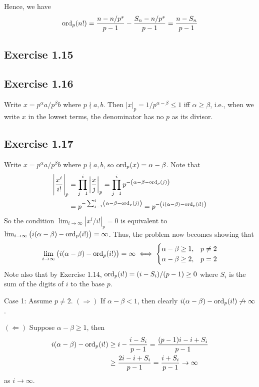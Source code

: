 \documentclass[../Koblitz.tex]{subfiles}
\begin{document}
Hence, we have
\begin{align*}
    \operatorname{ord}_p(n!) = \frac{n-n/p^s}{p-1} - \frac{S_n - n/p^s}{p-1} = \frac{n-S_n}{p-1}
\end{align*}

\subsection*{Exercise 1.15}

\subsection*{Exercise 1.16}

Write $x=p^\alpha a/p^\beta b$ where $p\nmid a,b$. Then $|x|_p=1/p^{\alpha-\beta}\leq1$ iff $\alpha\geq\beta$, i.e., when we write $x$ in the lowest terms, the denominator has no $p$ as its divisor.

\subsection*{Exercise 1.17}

Write $x=p^\alpha a/p^\beta b$ where $p\nmid a,b$, so $\operatorname{ord}_p(x)=\alpha-\beta$. Note that
\begin{align*}
    \left|\frac{x^i}{i!}\right|_p &= \prod_{j=1}^i \left|\frac{x}{j}\right|_p = \prod_{j=1}^i p^{-\left(\alpha-\beta-\operatorname{ord}_p(j)\right)} \\
    &= p^{-\sum_{j=1}^i \left(\alpha-\beta-\operatorname{ord}_p(j)\right)} = p^{-\left(i(\alpha-\beta)-\operatorname{ord}_p(i!)\right)}
\end{align*}
So the condition $\lim_{i\to\infty} |x^i/i!|_p=0$ is equivalent to $\lim_{i\to\infty} \left(i(\alpha-\beta)-\operatorname{ord}_p(i!)\right)=\infty$. Thus, the problem now becomes showing that
\begin{align*}
    \lim_{i\to\infty} \left(i(\alpha-\beta)-\operatorname{ord}_p(i!)\right)=\infty \iff
    \begin{cases}
        \alpha-\beta\geq 1, &p\neq2 \\
        \alpha-\beta\geq 2, &p=2
    \end{cases}
\end{align*}
Note also that by Exercise 1.14, $\operatorname{ord}_p(i!)=(i-S_i)/(p-1)\geq0$ where $S_i$ is the sum of the digits of $i$ to the base $p$.

Case 1: Assume $p\neq2$. $(\Rightarrow)$ If $\alpha-\beta<1$, then clearly $i(\alpha-\beta)-\operatorname{ord}_p(i!)\not\to\infty$.

$(\Leftarrow)$ Suppose $\alpha-\beta\geq 1$, then
\begin{align*}
    i(\alpha-\beta)-\operatorname{ord}_p(i!) &\geq i-\frac{i-S_i}{p-1} = \frac{(p-1)i-i+S_i}{p-1} \\
    &\geq \frac{2i-i+S_i}{p-1} = \frac{i+S_i}{p-1} \to \infty
\end{align*}
as $i\to\infty$.
\end{document}

